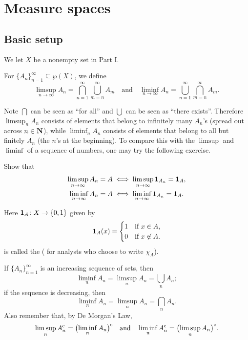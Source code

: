 \chapter{Measure spaces}
\section{Basic setup}
We let $X$ be a nonempty set in Part I.

\begin{defn}
    For $\{A_n\}_{n=1}^\infty\subseteq \wp(X)$, we define \[
        \limsup_{n \to \infty} A_n = \bigcap_{n=1}^\infty \bigcup_{m=n}^\infty A_m \quad \text{and}\quad \liminf_{n \to \infty} A_n = \bigcup_{n = 1}^\infty \bigcap_{m = n}^\infty A_m.
    \]
\end{defn}
Note $\bigcap$ can be seen as ``for all'' and $\bigcup$ can be seen as ``there exists''. Therefore $\limsup_n A_n$ consists of elements that belong to infinitely many $A_n$'s (spread out across $n \in \mathbf{N}$), while $\liminf_n A_n$ consists of elements that belong to all but finitely $A_n$ (the $n$'s at the beginning). To compare this with the $\limsup$ and $\liminf$ of a sequence of numbers, one may try the following exercise.

\begin{xca}
    Show that \begin{align*}
        \limsup_{n \to \infty}  A_n = A & \iff \limsup_{n \to \infty} \mathbf{1}_{A_n} = \mathbf{1}_A, \\
        \liminf_{n \to \infty}  A_n = A & \iff \liminf_{n \to \infty} \mathbf{1}_{A_n} = \mathbf{1}_A.
    \end{align*}

    Here $\mathbf{1}_A\colon X \to \{0,1\}$ given by \[
        \mathbf{1}_A(x)= \begin{cases}
            1 & \text{if } x \in A, \\
            0 & \text{if } x \not\in A.
        \end{cases}
    \]
    is called the  ( for analysts who choose to write $\chi_A$).
\end{xca}

If $\{A_n\}_{n=1}^\infty$ is an increasing sequence of sets, then \[
    \liminf_n A_n = \limsup_n A_n = \bigcup_n A_n;
\] if the sequence is decreasing, then \[
    \liminf_n A_n = \limsup_n A_n = \bigcap_n A_n.
\] Also remember that, by De Morgan's Law, \[
    \limsup_n A_n^{\mathrm{c}} = \bigl(\liminf_n A_n\bigr)^{\mathrm{c}} \quad \text{and}\quad 
    \liminf_n A_n^{\mathrm{c}} = \bigl(\limsup_n A_n \bigr)^{\mathrm{c}}.
\]

